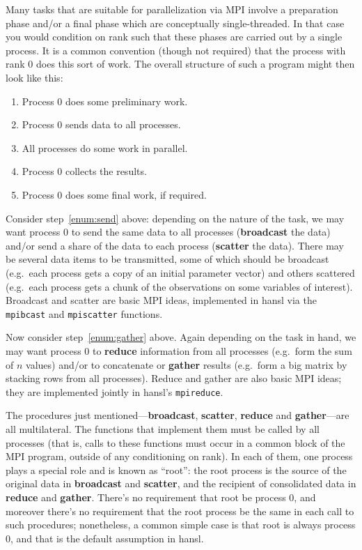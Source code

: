 \documentclass{article}
\begin{document}
Many tasks that are suitable for parallelization via MPI involve a
preparation phase and/or a final phase which are conceptually
single-threaded. In that case you would condition on rank such that
these phases are carried out by a single process. It is a common
convention (though not required) that the process with rank 0 does
this sort of work. The overall structure of such a program might then
look like this:
\begin{enumerate}
\item Process 0 does some preliminary work.
\item Process 0 sends data to all processes.\label{enum:send}
\item All processes do some work in parallel.
\item Process 0 collects the results.\label{enum:gather}
\item Process 0 does some final work, if required.
\end{enumerate}

Consider step~\ref{enum:send} above: depending on the nature of the
task, we may want process 0 to send the same data to all processes
(\textbf{broadcast} the data) and/or send a share of the data to each
process (\textbf{scatter} the data).  There may be several data items
to be transmitted, some of which should be broadcast (e.g.\ each
process gets a copy of an initial parameter vector) and others
scattered (e.g.\ each process gets a chunk of the observations on some
variables of interest).  Broadcast and scatter are basic MPI ideas,
implemented in hansl via the \texttt{mpibcast} and \texttt{mpiscatter}
functions.

Now consider step~\ref{enum:gather} above. Again depending on the task
in hand, we may want process 0 to \textbf{reduce} information from all
processes (e.g.\ form the sum of $n$ values) and/or to concatenate or
\textbf{gather} results (e.g.\ form a big matrix by stacking rows from
all processes). Reduce and gather are also basic MPI ideas; they are
implemented jointly in hansl's \texttt{mpireduce}.

The procedures just mentioned---\textbf{broadcast}, \textbf{scatter},
\textbf{reduce} and \textbf{gather}---are all multilateral. The
functions that implement them must be called by all processes (that
is, calls to these functions must occur in a common block of the MPI
program, outside of any conditioning on rank). In each of them, one
process plays a special role and is known as ``root'': the root
process is the source of the original data in \textbf{broadcast} and
\textbf{scatter}, and the recipient of consolidated data in
\textbf{reduce} and \textbf{gather}. There's no requirement that root
be process 0, and moreover there's no requirement that the root
process be the same in each call to such procedures; nonetheless, a
common simple case is that root is always process 0, and that is the
default assumption in hansl.
\end{document}
